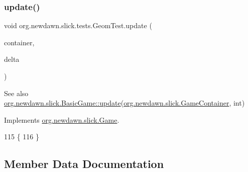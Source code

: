 \mbox{\label{classorg_1_1newdawn_1_1slick_1_1tests_1_1_geom_test_a41c184dc80983f6161e27122f65713f4}} 
\subsubsection{\texorpdfstring{update()}{update()}}
{\footnotesize\ttfamily void org.\+newdawn.\+slick.\+tests.\+Geom\+Test.\+update (\begin{DoxyParamCaption}\item[{\mbox{\hyperlink{classorg_1_1newdawn_1_1slick_1_1_game_container}{Game\+Container}}}]{container,  }\item[{int}]{delta }\end{DoxyParamCaption})\hspace{0.3cm}{\ttfamily [inline]}}

\begin{DoxySeeAlso}{See also}
\mbox{\hyperlink{classorg_1_1newdawn_1_1slick_1_1_basic_game_acfe6fa05aef83bff1631af91a3e4bd20}{org.\+newdawn.\+slick.\+Basic\+Game\+::update}}(\mbox{\hyperlink{classorg_1_1newdawn_1_1slick_1_1_game_container}{org.\+newdawn.\+slick.\+Game\+Container}}, int) 
\end{DoxySeeAlso}


Implements \mbox{\hyperlink{interfaceorg_1_1newdawn_1_1slick_1_1_game_ab07b2e9463ee4631620dde0de25bdee8}{org.\+newdawn.\+slick.\+Game}}.


\begin{DoxyCode}
115                                                            \{
116     \}
\end{DoxyCode}


\subsection{Member Data Documentation}
\mbox{\label{classorg_1_1newdawn_1_1slick_1_1tests_1_1_geom_test_adb8595b3dd3956c9885a33c2851b0a84}} 
